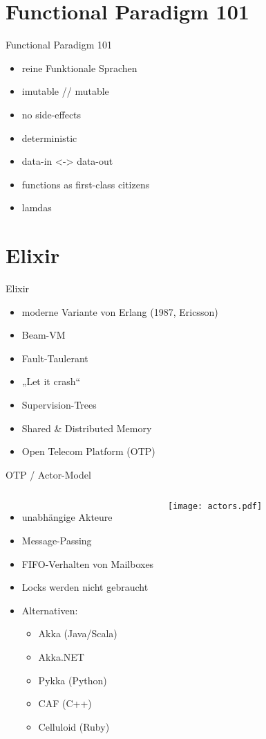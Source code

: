 \documentclass[compress]{beamer}
\begin{document}
\section{Functional Paradigm 101}
  \begin{frame}{Functional Paradigm 101}
    \begin{itemize}
      \item reine Funktionale Sprachen
      \item imutable // mutable
      \item no side-effects
      \item deterministic
      \item data-in <-> data-out
      \item functions as first-class citizens
      \item lamdas
    \end{itemize}
  \end{frame}

\section{Elixir}
  \begin{frame}{Elixir}
    \begin{itemize}
      \item moderne Variante von Erlang (1987, Ericsson)
      \item Beam-VM
      \item Fault-Taulerant
      \item „Let it crash“
      \item Supervision-Trees
      \item Shared \& Distributed Memory
      \item Open Telecom Platform (OTP)
    \end{itemize}
  \end{frame}

  \begin{frame}{OTP / Actor-Model}
    \begin{columns}[c]
    \begin{itemize}
      \item unabhängige Akteure
      \item Message-Passing
      \item FIFO-Verhalten von \alert{Mailboxes}
      \item Locks werden nicht gebraucht
      \item Alternativen:
        \begin{itemize}
          \item Akka (Java/Scala)
          \item Akka.NET
          \item Pykka (Python)
          \item CAF (C++)
          \item Celluloid (Ruby)
        \end{itemize}
    \end{itemize}
      \texttt{[image: actors.pdf]}
    \end{columns}
  \end{frame}
\end{document}
